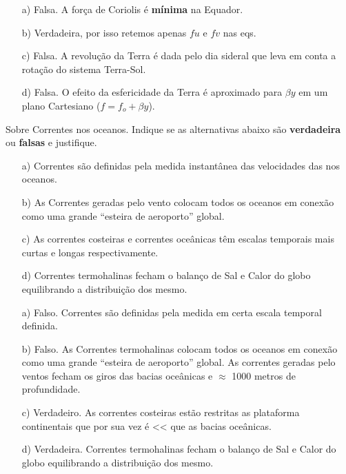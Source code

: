 \documentclass[letterpaper,portuguese,12pt,pdftex]{exam}
\begin{document}
\begin{questions}
\begin{solution}
\begin{itemize}
  \item[a)] Falsa. A força de Coriolis é {\bf mínima} na Equador.
  \item[b)] Verdadeira, por isso retemos apenas $fu$ e $fv$ nas eqs.
  \item[c)] Falsa. A revolução da Terra é dada pelo dia sideral que leva em
            conta a rotação do sistema Terra-Sol.
  \item[d)] Falsa. O efeito da esfericidade da Terra é aproximado para $\beta y$
            em um plano Cartesiano ($f = f_o + \beta y$).
\end{itemize}
\end{solution}

\question[2\half]
Sobre Correntes nos oceanos.  Indique se as alternativas abaixo são
{\bf verdadeira} ou {\bf falsas} e justifique.

\begin{itemize}
  \item[a)] Correntes são definidas pela medida instantânea das velocidades das
            nos oceanos.
  \item[b)] As Correntes geradas pelo vento colocam todos os oceanos em
            conexão como uma grande ``esteira de aeroporto'' global.
  \item[c)] As correntes costeiras e correntes oceânicas têm escalas
            temporais mais curtas e longas respectivamente.
  \item[d)] Correntes termohalinas fecham o balanço de Sal e Calor do globo
            equilibrando a distribuição dos mesmo.
\end{itemize}

\begin{solution}
\begin{itemize}
  \item[a)] Falso. Correntes são definidas pela medida em certa escala temporal
            definida.
  \item[b)] Falso. As Correntes termohalinas colocam todos os oceanos em
            conexão como uma grande ``esteira de aeroporto'' global.  As
            correntes geradas pelo ventos fecham os giros das bacias oceânicas
            e $\approx$ 1000 metros de profundidade.
  \item[c)] Verdadeiro. As correntes costeiras estão restritas as plataforma
            continentais que por sua vez é << que as bacias oceânicas.
  \item[d)] Verdadeira. Correntes termohalinas fecham o balanço de Sal e Calor do globo
            equilibrando a distribuição dos mesmo.
\end{itemize}
\end{solution}

\end{questions}
\end{document}
